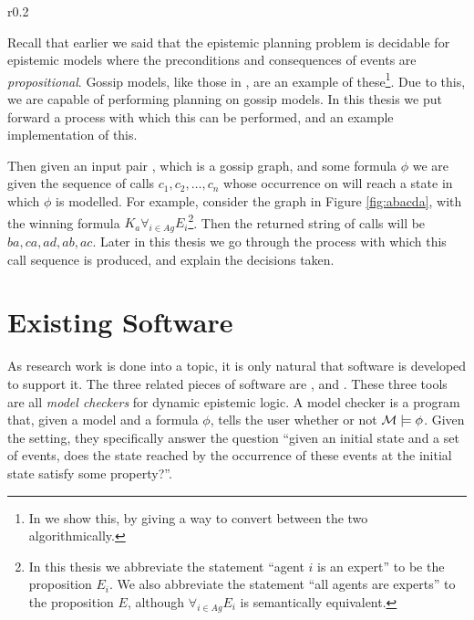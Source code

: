 \documentclass[10pt, a4paper]{report}
\begin{document}
\begin{wrapfigure}{r}{0.2\textwidth}
  \centering
  \caption{}
  \label{fig:abacda}
\end{wrapfigure}

Recall that earlier we said that the epistemic planning problem is decidable for
epistemic models where the preconditions and consequences of events are
\emph{propositional}. Gossip models, like those in ,
are an example of these\footnote{In  we show this, by
giving a way to convert between the two algorithmically.}. Due to this, we are
capable of performing planning on gossip models. In this thesis we put forward a
process with which this can be performed, and an example implementation of this.

Then given an input pair , which is a gossip graph, and some formula
$\phi$ we are given the sequence of calls $c_1, c_2, \ldots, c_n$ whose
occurrence on  will reach a state in which $\phi$ is modelled. For
example, consider the graph in Figure \ref{fig:abacda}, with the winning formula
$K_a \forall_{i \in Ag} E_i$\footnote{In this thesis we abbreviate the statement
  ``agent $i$ is an expert'' to be the proposition $E_i$. We also abbreviate the
  statement ``all agents are experts'' to the proposition $E$, although
  $\forall_{i \in Ag}E_i$ is semantically equivalent.}. Then the returned string
of calls will be $ba, ca, ad, ab, ac$. Later in this thesis we go through the
process with which this call sequence is produced, and explain the decisions
taken.

\section{Existing Software}

As research work is done into a topic, it is only natural that software is
developed to support it. The three related pieces of software are
\cite{DEMO-S5}, \cite{SMCDEL} and \cite{GithubGossip}. These three tools are all
\emph{model checkers} for dynamic epistemic logic. A model checker is a
program that, given a model  and a formula $\phi$, tells the user whether
or not $\mathcal{M} \models \phi$. Given the setting, they specifically answer the
question ``given an initial state and a set of events, does the state reached by
the occurrence of these events at the initial state satisfy some property?''.
\end{document}
